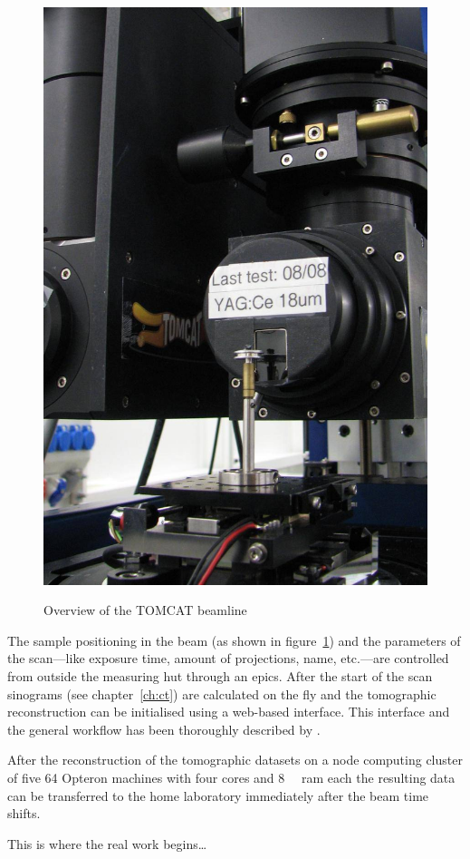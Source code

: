 \begin{figure}
{		\includegraphics[width=\imsize]{img/TOMCAT2}%
		\label{subfig:TOMCAT2}%
		}%
	\caption{Overview of the TOMCAT beamline}
	\label{fig:tomcat}
\end{figure}

The sample positioning in the beam (as shown in figure~\ref{fig:tomcat}) and the parameters of the scan---like exposure time, amount of projections, name, etc.---are controlled from outside the measuring hut through an \ac{epics}. After the start of the scan sinograms (see chapter~\ref{ch:ct}) are calculated on the fly and the tomographic reconstruction can be initialised using a web-based interface. This interface and the general workflow has been thoroughly described by \citet{Hintermueller2010}.

After the reconstruction of the tomographic datasets on a node computing cluster of five \SI{64}{\bit} Opteron machines with four cores and \SI{8}{\giga\byte} \acs{ram} each the resulting data can be transferred to the home laboratory immediately after the beam time shifts.

This is where the real work begins\ldots